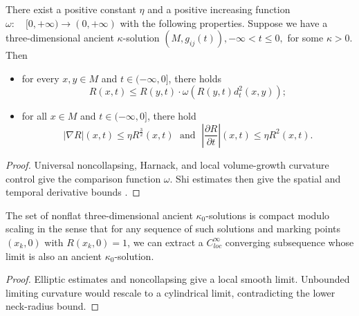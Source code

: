\begin{theorem}
  \label{thm:cz-ancient-kappa-elliptic-estimates}
 There exist a positive constant $\eta$ and a
positive increasing function $\omega:\quad [0,+\infty)\rightarrow
(0,+\infty)$ with the following properties. Suppose we have a
three-dimensional ancient $\kappa$-solution
$(M,g_{ij}(t)),-\infty<t\le 0,$ for some $\kappa>0$. Then
\begin{itemize}
\item[(i)]for every $x,y\in M$ and $t\in(-\infty,0]$, there holds
$$
R(x,t)\le R(y,t)\cdot \omega(R(y,t)d_t^2(x,y));
$$
\item[(ii)] for all $x\in M$ and $t\in (-\infty,0]$, there hold
$$
|\nabla R|(x,t)\le\eta R^\frac{3}{2}(x,t)\;  \mbox{ and }\;
\left|\frac{\partial R}{\partial t}\right|(x,t)\le \eta R^2(x,t).
$$
\end{itemize}
\end{theorem}
\begin{proof}
\sketch Universal noncollapsing, Harnack, and local volume-growth
curvature control give the comparison function $\omega$.  Shi estimates
then give the spatial and temporal derivative bounds \cite{P1}.
\end{proof}
\begin{corollary}
  \label{cor:cz-ancient-kappa-solution-compactness}
 The set of
nonflat three-dimensional ancient $\kappa_0$-solutions is compact
modulo scaling in the sense that for any sequence of such
solutions and marking points $(x_k,0)$ with $R(x_k,0)=1$, we can
extract a $C^\infty_{loc}$ converging subsequence whose limit is
also an ancient $\kappa_0$-solution.
\end{corollary}
\begin{proof}
\sketch Elliptic estimates and noncollapsing give a local smooth limit.
Unbounded limiting curvature would rescale to a cylindrical limit,
contradicting the lower neck-radius bound.
\end{proof}
